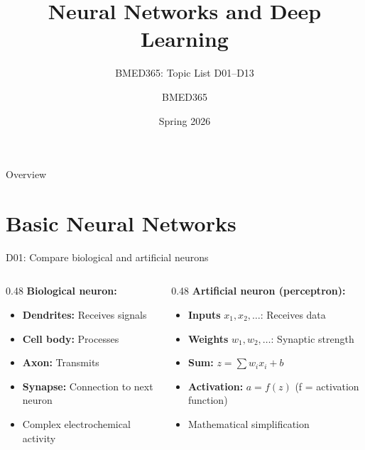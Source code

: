 \documentclass[aspectratio=169, 10pt]{beamer}
\title{Neural Networks and Deep Learning}
\subtitle{BMED365: Topic List D01--D13}
\author{BMED365}
\date{Spring 2026}
\begin{document}
\begin{frame}
    \titlepage
\end{frame}

\begin{frame}{Overview}
    \tableofcontents
\end{frame}

\section{Basic Neural Networks}

\begin{frame}{D01: Compare biological and artificial neurons}
    \begin{columns}[T]
        \begin{column}{0.48\textwidth}
            \textbf{Biological neuron:}
            \begin{itemize}
                \item \textbf{Dendrites:} Receives signals
                \item \textbf{Cell body:} Processes
                \item \textbf{Axon:} Transmits
                \item \textbf{Synapse:} Connection to next neuron
                \item Complex electrochemical activity
            \end{itemize}
        \end{column}
        \begin{column}{0.48\textwidth}
            \textbf{Artificial neuron (perceptron):}
            \begin{itemize}
                \item \textbf{Inputs} $x_1, x_2, \ldots$: Receives data
                \item \textbf{Weights} $w_1, w_2, \ldots$: Synaptic strength
                \item \textbf{Sum:} $z = \sum w_i x_i + b$
                \item \textbf{Activation:} $a = f(z)$ \small(f = activation function)
                \item Mathematical simplification
            \end{itemize}
        \end{column}
    \end{columns}
    

\end{frame}
\end{document}
